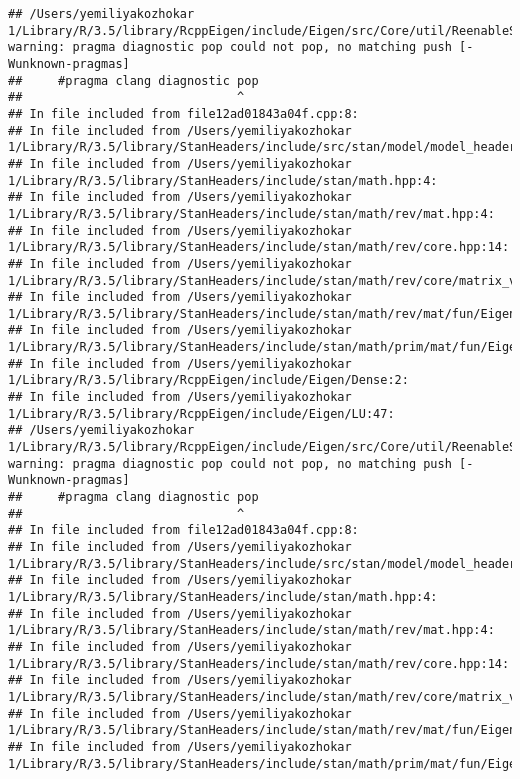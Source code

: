 \documentclass[]{article}
\begin{document}
\begin{verbatim}
## /Users/yemiliyakozhokar 1/Library/R/3.5/library/RcppEigen/include/Eigen/src/Core/util/ReenableStupidWarnings.h:10:30: warning: pragma diagnostic pop could not pop, no matching push [-Wunknown-pragmas]
##     #pragma clang diagnostic pop
##                              ^
## In file included from file12ad01843a04f.cpp:8:
## In file included from /Users/yemiliyakozhokar 1/Library/R/3.5/library/StanHeaders/include/src/stan/model/model_header.hpp:4:
## In file included from /Users/yemiliyakozhokar 1/Library/R/3.5/library/StanHeaders/include/stan/math.hpp:4:
## In file included from /Users/yemiliyakozhokar 1/Library/R/3.5/library/StanHeaders/include/stan/math/rev/mat.hpp:4:
## In file included from /Users/yemiliyakozhokar 1/Library/R/3.5/library/StanHeaders/include/stan/math/rev/core.hpp:14:
## In file included from /Users/yemiliyakozhokar 1/Library/R/3.5/library/StanHeaders/include/stan/math/rev/core/matrix_vari.hpp:4:
## In file included from /Users/yemiliyakozhokar 1/Library/R/3.5/library/StanHeaders/include/stan/math/rev/mat/fun/Eigen_NumTraits.hpp:4:
## In file included from /Users/yemiliyakozhokar 1/Library/R/3.5/library/StanHeaders/include/stan/math/prim/mat/fun/Eigen.hpp:4:
## In file included from /Users/yemiliyakozhokar 1/Library/R/3.5/library/RcppEigen/include/Eigen/Dense:2:
## In file included from /Users/yemiliyakozhokar 1/Library/R/3.5/library/RcppEigen/include/Eigen/LU:47:
## /Users/yemiliyakozhokar 1/Library/R/3.5/library/RcppEigen/include/Eigen/src/Core/util/ReenableStupidWarnings.h:10:30: warning: pragma diagnostic pop could not pop, no matching push [-Wunknown-pragmas]
##     #pragma clang diagnostic pop
##                              ^
## In file included from file12ad01843a04f.cpp:8:
## In file included from /Users/yemiliyakozhokar 1/Library/R/3.5/library/StanHeaders/include/src/stan/model/model_header.hpp:4:
## In file included from /Users/yemiliyakozhokar 1/Library/R/3.5/library/StanHeaders/include/stan/math.hpp:4:
## In file included from /Users/yemiliyakozhokar 1/Library/R/3.5/library/StanHeaders/include/stan/math/rev/mat.hpp:4:
## In file included from /Users/yemiliyakozhokar 1/Library/R/3.5/library/StanHeaders/include/stan/math/rev/core.hpp:14:
## In file included from /Users/yemiliyakozhokar 1/Library/R/3.5/library/StanHeaders/include/stan/math/rev/core/matrix_vari.hpp:4:
## In file included from /Users/yemiliyakozhokar 1/Library/R/3.5/library/StanHeaders/include/stan/math/rev/mat/fun/Eigen_NumTraits.hpp:4:
## In file included from /Users/yemiliyakozhokar 1/Library/R/3.5/library/StanHeaders/include/stan/math/prim/mat/fun/Eigen.hpp:4:

\end{verbatim}
\end{document}
